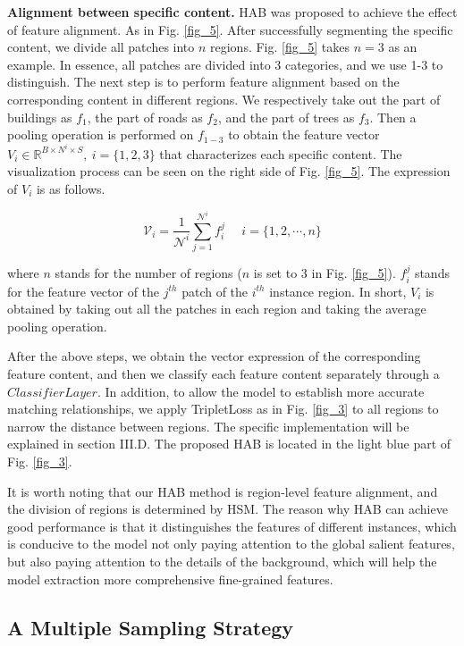 \documentclass[lettersize,journal]{IEEEtran}
\begin{document}
\textbf{Alignment between specific content.} HAB was proposed to achieve the effect of feature alignment. As in Fig. \ref{fig_5}. After successfully segmenting the specific content, we divide all patches into $n$ regions. Fig. \ref{fig_5} takes $n=3$ as an example. In essence, all patches are divided into 3 categories, and we use 1-3 to distinguish. The next step is to perform feature alignment based on the corresponding content in different regions. We respectively take out the part of buildings as $f_1$, the part of roads as $f_2$, and the part of trees as $f_3$. Then a pooling operation is performed on $f_{1-3}$ to obtain the feature vector $V_i\in{\mathbb{R}^{B\times{}N^i\times{}S}}, \ i=\{1,2,3\}$ that characterizes each specific content. The visualization process can be seen on the right side of Fig. \ref{fig_5}. The expression of $V_i$ is as follows.

\begin{equation}
\label{eq5}
\mathcal{V}_i=\frac{1}{\mathcal{N}^i}\textstyle\sum_{j=1}^{\mathcal{N}^i}f_i^j\ \ \ \ \ \ i=\{1,2,\cdots{},n\}
\end{equation}

where $n$ stands for the number of regions ($n$ is set to 3 in Fig. \ref{fig_5}). $f_i^j$ stands for the feature vector of the $j^{th}$ patch of the $i^{th}$ instance region. In short, $V_i$ is  obtained by taking out all the patches in each region and taking the average pooling operation.

After the above steps, we obtain the vector expression of the corresponding feature content, and then we classify each feature content separately through a $Classifier Layer$. In addition, to allow the model to establish more accurate matching relationships, we apply TripletLoss as in Fig. \ref{fig_3} to all regions to narrow the distance between regions. The specific implementation will be explained in section III.D. The proposed HAB is located in the light blue part of Fig. \ref{fig_3}. 

It is worth noting that our HAB method is region-level feature alignment, and the division of regions is determined by HSM. The reason why HAB can achieve good performance is that it distinguishes the features of different instances, which is conducive to the model not only paying attention to the global salient features, but also paying attention to the details of the background, which will help the model extraction more comprehensive fine-grained features. 

\subsection{A Multiple Sampling Strategy}
\end{document}
